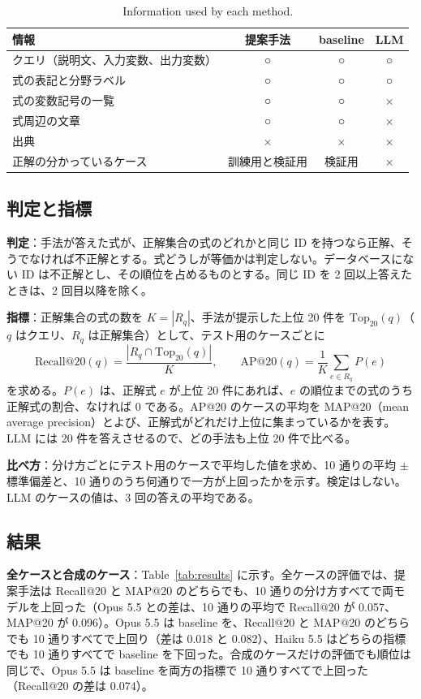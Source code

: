 \documentclass[a4j,dvipdfmx,10pt]{jresume}
\newcommand{\Top}{\mathrm{Top}}
\begin{document}
\begin{table}[t]\centering
\footnotesize
\caption{Information used by each method.}
\label{tab:inputs}
\begin{tabular}{@{}lccc@{}}
\toprule
情報 & 提案手法 & baseline & LLM \\
\midrule
クエリ（説明文、入力変数、出力変数） & ○ & ○ & ○ \\
式の表記と分野ラベル & ○ & ○ & ○ \\
式の変数記号の一覧 & ○ & ○ & × \\
式周辺の文章 & ○ & ○ & × \\
出典 & × & × & × \\
正解の分かっているケース & 訓練用と検証用 & 検証用 & × \\
\bottomrule
\end{tabular}
\end{table}

\subsection{判定と指標}
\textbf{判定}：手法が答えた式が、正解集合の式のどれかと同じ ID を持つなら正解、そうでなければ不正解とする。式どうしが等価かは判定しない。データベースにない ID は不正解とし、その順位を占めるものとする。同じ ID を 2 回以上答えたときは、2 回目以降を除く。

\textbf{指標}：正解集合の式の数を $K = |R_q|$、手法が提示した上位 20 件を $\Top_{20}(q)$（$q$ はクエリ、$R_q$ は正解集合）として、テスト用のケースごとに
\begin{equation*}
  \mathrm{Recall@20}(q) = \frac{|R_q \cap \Top_{20}(q)|}{K}, \qquad
  \mathrm{AP@20}(q) = \frac{1}{K} \sum_{e \in R_q} P(e)
\end{equation*}
を求める。$P(e)$ は、正解式 $e$ が上位 20 件にあれば、$e$ の順位までの式のうち正解式の割合、なければ 0 である。AP@20 のケースの平均を MAP@20（mean average precision）とよび、正解式がどれだけ上位に集まっているかを表す。LLM には 20 件を答えさせるので、どの手法も上位 20 件で比べる。

\textbf{比べ方}：分け方ごとにテスト用のケースで平均した値を求め、10 通りの平均 $\pm$ 標準偏差と、10 通りのうち何通りで一方が上回ったかを示す。検定はしない。LLM のケースの値は、3 回の答えの平均である。

\subsection{結果}
\textbf{全ケースと合成のケース}：Table~\ref{tab:results} に示す。全ケースの評価では、提案手法は Recall@20 と MAP@20 のどちらでも、10 通りの分け方すべてで両モデルを上回った（Opus 5.5 との差は、10 通りの平均で Recall@20 が 0.057、MAP@20 が 0.096）。Opus 5.5 は baseline を、Recall@20 と MAP@20 のどちらでも 10 通りすべてで上回り（差は 0.018 と 0.082）、Haiku 5.5 はどちらの指標でも 10 通りすべてで baseline を下回った。合成のケースだけの評価でも順位は同じで、Opus 5.5 は baseline を両方の指標で 10 通りすべてで上回った（Recall@20 の差は 0.074）。
\end{document}
